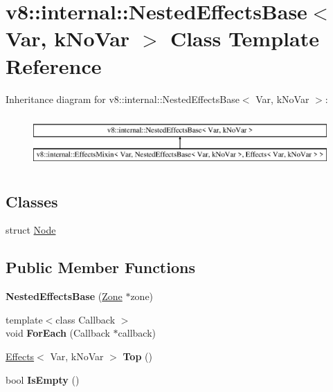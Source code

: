 \hypertarget{classv8_1_1internal_1_1_nested_effects_base}{}\section{v8\+:\+:internal\+:\+:Nested\+Effects\+Base$<$ Var, k\+No\+Var $>$ Class Template Reference}
\label{classv8_1_1internal_1_1_nested_effects_base}
Inheritance diagram for v8\+:\+:internal\+:\+:Nested\+Effects\+Base$<$ Var, k\+No\+Var $>$\+:\begin{figure}[H]
\begin{center}
\leavevmode
\includegraphics[height=2.000000cm]{classv8_1_1internal_1_1_nested_effects_base}
\end{center}
\end{figure}
\subsection*{Classes}
\begin{DoxyCompactItemize}
\item 
struct \hyperlink{structv8_1_1internal_1_1_nested_effects_base_1_1_node}{Node}
\end{DoxyCompactItemize}
\subsection*{Public Member Functions}
\begin{DoxyCompactItemize}
\item 
{\bfseries Nested\+Effects\+Base} (\hyperlink{classv8_1_1internal_1_1_zone}{Zone} $\ast$zone)\hypertarget{classv8_1_1internal_1_1_nested_effects_base_a5280e7930014664034aee789369a9558}{}\label{classv8_1_1internal_1_1_nested_effects_base_a5280e7930014664034aee789369a9558}

\item 
{\footnotesize template$<$class Callback $>$ }\\void {\bfseries For\+Each} (Callback $\ast$callback)\hypertarget{classv8_1_1internal_1_1_nested_effects_base_a8be950e509a39725bdb942d8902f1b09}{}\label{classv8_1_1internal_1_1_nested_effects_base_a8be950e509a39725bdb942d8902f1b09}

\item 
\hyperlink{classv8_1_1internal_1_1_effects}{Effects}$<$ Var, k\+No\+Var $>$ {\bfseries Top} ()\hypertarget{classv8_1_1internal_1_1_nested_effects_base_a037b86188bb26d23e264c91d074b800a}{}\label{classv8_1_1internal_1_1_nested_effects_base_a037b86188bb26d23e264c91d074b800a}

\item 
bool {\bfseries Is\+Empty} ()\hypertarget{classv8_1_1internal_1_1_nested_effects_base_a805770a584d96515ed8153ae8a8a1ec7}{}\label{classv8_1_1internal_1_1_nested_effects_base_a805770a584d96515ed8153ae8a8a1ec7}

\end{DoxyCompactItemize}
